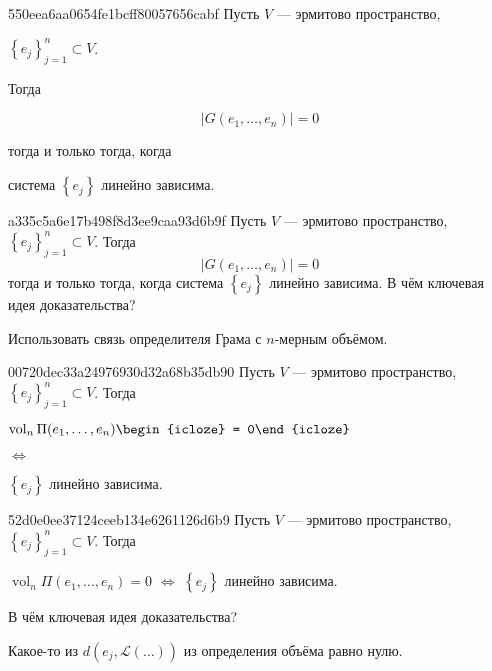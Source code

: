 \begin{note}{550eea6aa0654fe1bcff80057656cabf}
    Пусть \({ V }\) --- эрмитово пространство, \begin{icloze}{4}\({ \left\{ e_j \right\}_{j = 1}^{n} \subset V }\).\end{icloze}
    Тогда \begin{icloze}{2}
        \[
            \left\lvert G(e_1, \ldots, e_n) \right\rvert = 0
        \]
    \end{icloze} \begin{icloze}{3}тогда и только тогда, когда\end{icloze} \begin{icloze}{1}система \({ \left\{ e_j \right\} }\) линейно зависима.\end{icloze}
\end{note}

\begin{note}{a335c5a6e17b498f8d3ee9caa93d6b9f}
    Пусть \({ V }\) --- эрмитово пространство, \({ \left\{ e_j \right\}_{j = 1}^{n} \subset V }\).
    Тогда
    \[
        \left\lvert G(e_1, \ldots, e_n) \right\rvert = 0
    \]
    тогда и только тогда, когда система \({ \left\{ e_j \right\} }\) линейно зависима.
    В чём ключевая идея доказательства?

    \begin{cloze}{1}
        Использовать связь определителя Грама с \({ n }\)-мерным объёмом.
    \end{cloze}
\end{note}

\begin{note}{00720dec33a24976930d32a68b35db90}
    Пусть \({ V }\) --- эрмитово пространство, \({ \left\{ e_j \right\}_{j = 1}^{n} \subset V }\).
    Тогда
    \begin{center}
        \({ \operatorname{vol}_{n} \Pi(e_1, \ldots, e_n) \begin{icloze}{2}= 0\end{icloze} }\) \begin{icloze}{3}\({ \iff }\)\end{icloze} \begin{icloze}{1}\({ \left\{ e_j \right\} }\) линейно зависима.\end{icloze}
    \end{center}
\end{note}

\begin{note}{52d0e0ee37124ceeb134e6261126d6b9}
    Пусть \({ V }\) --- эрмитово пространство, \({ \left\{ e_j \right\}_{j = 1}^{n} \subset V }\).
    Тогда
    \begin{center}
        \({ \operatorname{vol}_{n} \Pi(e_1, \ldots, e_n) = 0 }\) \({ \iff }\) \({ \left\{ e_j \right\} }\) линейно зависима.
    \end{center}
    В чём ключевая идея доказательства?

    \begin{cloze}{1}
        Какое-то из \({ d(e_j, \mathscr L (\ldots)) }\) из определения объёма равно нулю.
    \end{cloze}
\end{note}

